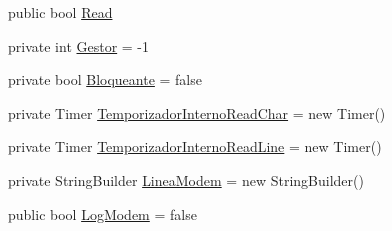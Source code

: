 \begin{DoxyCompactItemize}
\item 
public bool \hyperlink{namespaceedwinspire_1_1Ports_a5efed4bf03757ef2f2356e4d58bc0b25}{Read}
\item 
private int \hyperlink{namespaceedwinspire_1_1Ports_a7f31b8084b1c093dde91fd7d442f0c33}{Gestor} = -\/1
\item 
private bool \hyperlink{namespaceedwinspire_1_1Ports_a2da87d6ac29df3f3ae83c405a4cfcd0f}{Bloqueante} = false
\item 
private Timer \hyperlink{namespaceedwinspire_1_1Ports_a511c71a745dc25f1cec7d9b3977c1029}{Temporizador\-Interno\-Read\-Char} = new Timer()
\item 
private Timer \hyperlink{namespaceedwinspire_1_1Ports_a3fcb86d18a35e8e4926c82ffa679911a}{Temporizador\-Interno\-Read\-Line} = new Timer()
\item 
private String\-Builder \hyperlink{namespaceedwinspire_1_1Ports_a572884312471246cd0581385d6ce5abd}{Linea\-Modem} = new String\-Builder()
\item 
public bool \hyperlink{namespaceedwinspire_1_1Ports_a2d90f7f91e2a32b3ba4885640203178a}{Log\-Modem} = false
\end{DoxyCompactItemize}


